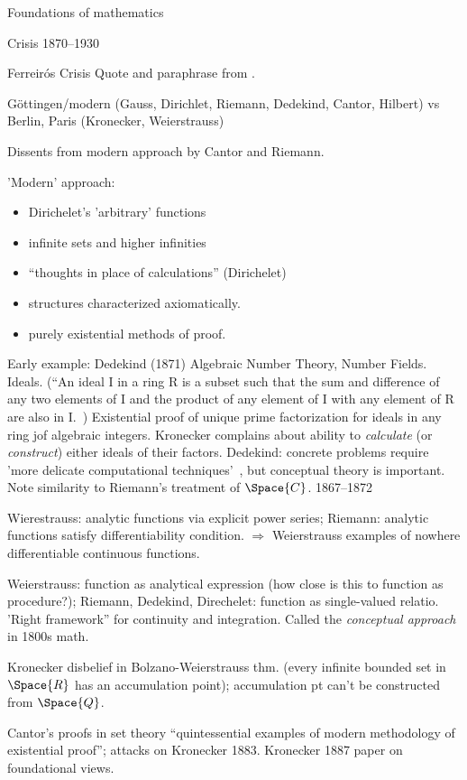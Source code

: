 \begin{plSection}{Foundations of mathematics}
\begin{plSection}{Crisis 1870--1930}
\begin{plSection}{Ferreir\'{o}s Crisis}
Quote and paraphrase from 
.

G\"{o}ttingen/modern 
(Gauss, Dirichlet, Riemann, Dedekind, Cantor, Hilbert)
vs
Berlin, Paris (Kronecker, Weierstrauss)

Dissents from modern approach by Cantor and Riemann.

'Modern' approach:
\begin{itemize}
\item Dirichelet's 'arbitrary' functions
\item infinite sets and higher infinities
\item ``thoughts in place of calculations'' (Dirichelet)
\item structures characterized axiomatically.
\item purely existential methods of proof.
\end{itemize}

Early example: Dedekind (1871) Algebraic Number Theory,
Number Fields. Ideals.
 (``An ideal I in a ring R is a subset 
 such that the sum and difference of any two elements of I 
 and the product of any element of I with any element of R 
 are also in I.~\cite{sep:DedekindFoundations})
Existential proof of unique prime factorization for
ideals in any ring jof algebraic integers.
Kronecker complains about ability to \textsl{calculate}
(or \textsl{construct})
either ideals of their factors.
Dedekind: concrete problems require 
'more delicate computational techniques'~\cite{Ferreiros:2008:Crisis},
but conceptual theory is important.
Note similarity to Riemann's treatment of $\Space{C}$.
1867--1872

Wierestrauss: analytic functions via explicit power series;
Riemann: analytic functions satisfy differentiability condition.
$\Rightarrow$ Weierstrauss examples of nowhere differentiable
continuous functions.

Weierstrauss: function as analytical expression 
(how close is this to function as procedure?);
Riemann, Dedekind, Direchelet: function as single-valued relatio.
'Right framework'' for continuity and integration.
Called the \textit{conceptual approach} in 1800s math.

Kronecker disbelief in Bolzano-Weierstrauss thm.
(every infinite bounded set in $\Space{R}$ 
has an accumulation point);
accumulation pt can't be constructed from $\Space{Q}$.

Cantor's proofs in set theory ``quintessential examples
of modern methodology of existential proof''; 
attacks on Kronecker 1883.
Kronecker 1887 paper on foundational views.


\end{plSection}
\end{plSection}
\end{plSection}
